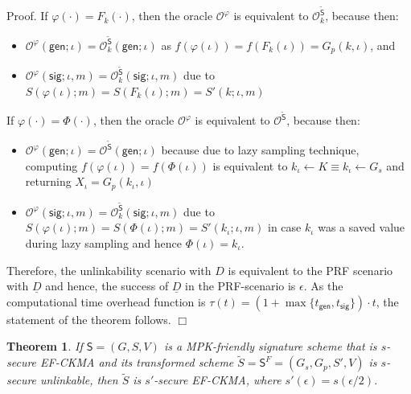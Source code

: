 \documentclass{article}
\newtheorem{theorem}{Theorem}[section]
\newenvironment{proof}{\textsf{Proof}.}{\hfill$\Box$}
\begin{document}
\begin{proof}
If $\varphi(\cdot)=F_k(\cdot)$, then the oracle $\mathcal{O}^\varphi$ is equivalent to  $\mathcal{O}^{\tilde{\mathsf{S}}}_k$, because then:
\begin{itemize}
\item $\mathcal{O}^\varphi(\mathsf{gen};\iota) = \mathcal{O}^{\tilde{\mathsf{S}}}_k(\mathsf{gen};\iota)$ as $f(\varphi(\iota)) = f(F_k(\iota))=G_p(k,\iota)$, and
\item
$\mathcal{O}^\varphi(\mathsf{sig};\iota,m) = \mathcal{O}^{\tilde{\mathsf{S}}}_k(\mathsf{sig};\iota,m)$
due to $S(\varphi(\iota);m)=S(F_k(\iota);m)=S'(k;\iota,m)$
\end{itemize}
If $\varphi(\cdot)=\Phi(\cdot)$, then the oracle $\mathcal{O}^\varphi$ is equivalent to  $\mathcal{O}^{\tilde{\mathsf{S}}}$, because then:
\begin{itemize}
\item $\mathcal{O}^\varphi(\mathsf{gen};\iota) = \mathcal{O}^{\tilde{\mathsf{S}}}(\mathsf{gen};\iota)$
because
due to lazy sampling technique, computing $f(\varphi(\iota)) = f(\Phi(\iota))$
is equivalent to $k_\iota\gets K\equiv k_\iota\gets G_s$ and returning
$X_\iota = G_p(k_\iota,\iota)$
\item
$\mathcal{O}^\varphi(\mathsf{sig};\iota,m) = \mathcal{O}^{\tilde{\mathsf{S}}}_k(\mathsf{sig};\iota,m)$
due to $S(\varphi(\iota);m)=S(\Phi(\iota);m)=S'(k_\iota;\iota,m)$ in case $k_\iota$ was a saved value during lazy sampling and hence $\Phi(\iota)=k_\iota$.
\end{itemize}
Therefore, the unlinkability scenario with $D$ is equivalent to the PRF scenario with $\underline{D}$ and
hence, the success of $\underline{D}$ in the PRF-scenario is $\epsilon$. As the computational time overhead function is $\tau(t) = (1+\max\{t_\mathsf{gen},t_\mathsf{sig}\})\cdot t$, the statement of the theorem follows.
\end{proof}

\begin{theorem}
If $\mathsf{S}=(G,S,V)$ is a MPK-friendly signature scheme that is $s$-secure EF-CKMA and its transformed scheme $\tilde{S}=\mathsf{S}^F=(G_s,G_p,S',V)$ is $s$-secure unlinkable, then $\tilde{S}$ is $s'$-secure EF-CKMA, where $s'(\epsilon) = s(\epsilon/2)$.
\end{theorem}
\end{document}
